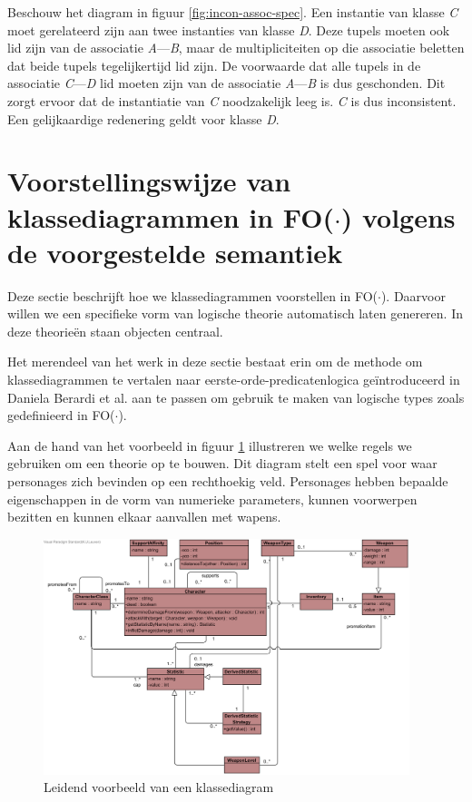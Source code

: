 Beschouw het diagram in figuur \ref{fig:incon-assoc-spec}. Een instantie van klasse \textit{C} moet gerelateerd zijn aan twee instanties van klasse \textit{D}. Deze tupels moeten ook lid zijn van de associatie \textit{A}---\textit{B}, maar de multipliciteiten op die associatie beletten dat beide tupels tegelijkertijd lid zijn. De voorwaarde dat alle tupels in de associatie \textit{C}---\textit{D} lid moeten zijn van de associatie \textit{A}---\textit{B} is dus geschonden. Dit zorgt ervoor dat de instantiatie van \textit{C} noodzakelijk leeg is. \textit{C} is dus inconsistent. Een gelijkaardige redenering geldt voor klasse \textit{D}.

\section{Voorstellingswijze van klassediagrammen in FO($\cdot$) volgens de voorgestelde semantiek}\label{sec:cd-rep-cons}

Deze sectie beschrijft hoe we klassediagrammen voorstellen in FO($\cdot$). Daarvoor willen we een specifieke vorm van logische theorie automatisch laten genereren. In deze theorie\"en staan objecten centraal. 

Het merendeel van het werk in deze sectie bestaat erin om de methode om klassediagrammen te vertalen naar eerste-orde-predicatenlogica ge\"introduceerd in Daniela Berardi et al.\cite{BerardiDaniela2005RoUc} aan te passen om gebruik te maken van logische types zoals gedefinieerd in FO($\cdot$).

Aan de hand van het voorbeeld in figuur \ref{fig:diagram-voorbeeld} illustreren we welke regels we gebruiken om een theorie op te bouwen. Dit diagram stelt een spel voor waar personages zich bevinden op een rechthoekig veld. Personages hebben bepaalde eigenschappen in de vorm van numerieke parameters, kunnen voorwerpen bezitten en kunnen elkaar aanvallen met wapens.

\begin{figure}[h]
	\includegraphics[width=0.95\textwidth]{chap-consistentie/diagram-voorbeeld.png}
	\caption{Leidend voorbeeld van een klassediagram}
	\label{fig:diagram-voorbeeld}
\end{figure}

